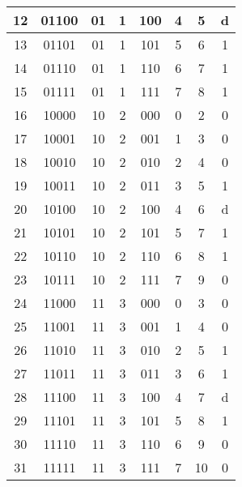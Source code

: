 \begin{table}[h!]
\begin{tabular}{|c|c|c|c|c|c|c|c|}
  12 & 01100                 & 01        & 1                & 100           & 4                   & 5  & d  \\ \hline
  13 & 01101                 & 01        & 1                & 101           & 5                   & 6  & 1  \\ \hline
  14 & 01110                 & 01        & 1                & 110           & 6                   & 7  & 1  \\ \hline
  15 & 01111                 & 01        & 1                & 111           & 7                   & 8  & 1  \\ \hline
  16 & 10000                 & 10        & 2                & 000           & 0                   & 2  & 0  \\ \hline
  17 & 10001                 & 10        & 2                & 001           & 1                   & 3  & 0  \\ \hline
  18 & 10010                 & 10        & 2                & 010           & 2                   & 4  & 0  \\ \hline
  19 & 10011                 & 10        & 2                & 011           & 3                   & 5  & 1  \\ \hline
  20 & 10100                 & 10        & 2                & 100           & 4                   & 6  & d  \\ \hline
  21 & 10101                 & 10        & 2                & 101           & 5                   & 7  & 1  \\ \hline
  22 & 10110                 & 10        & 2                & 110           & 6                   & 8  & 1  \\ \hline
  23 & 10111                 & 10        & 2                & 111           & 7                   & 9  & 0  \\ \hline
  24 & 11000                 & 11        & 3                & 000           & 0                   & 3  & 0  \\ \hline
  25 & 11001                 & 11        & 3                & 001           & 1                   & 4  & 0  \\ \hline
  26 & 11010                 & 11        & 3                & 010           & 2                   & 5  & 1  \\ \hline
  27 & 11011                 & 11        & 3                & 011           & 3                   & 6  & 1  \\ \hline
  28 & 11100                 & 11        & 3                & 100           & 4                   & 7  & d  \\ \hline
  29 & 11101                 & 11        & 3                & 101           & 5                   & 8  & 1  \\ \hline
  30 & 11110                 & 11        & 3                & 110           & 6                   & 9  & 0  \\ \hline
  31 & 11111                 & 11        & 3                & 111           & 7                   & 10 & 0  \\   \hline
  \end{tabular}
\end{table}